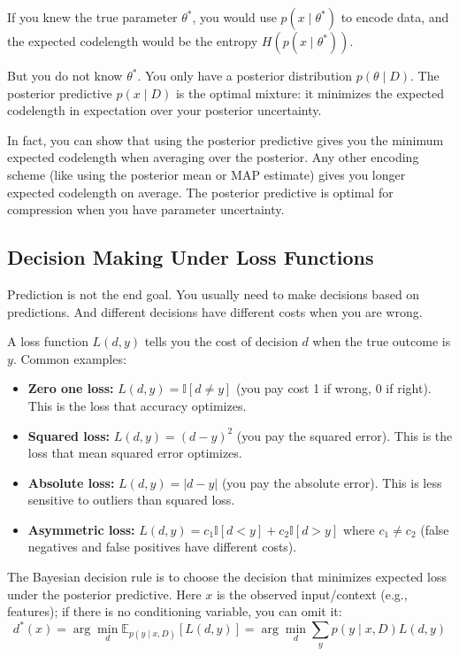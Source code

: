If you knew the true parameter $\theta^*$, you would use $p(x \mid \theta^*)$ to encode data, and the expected codelength would be the entropy $H(p(x \mid \theta^*))$.

But you do not know $\theta^*$. You only have a posterior distribution $p(\theta \mid D)$. The posterior predictive $p(x \mid D)$ is the optimal mixture: it minimizes the expected codelength in expectation over your posterior uncertainty.

In fact, you can show that using the posterior predictive gives you the minimum expected codelength when averaging over the posterior. Any other encoding scheme (like using the posterior mean or MAP estimate) gives you longer expected codelength on average. The posterior predictive is optimal for compression when you have parameter uncertainty.

\subsection{Decision Making Under Loss Functions}

Prediction is not the end goal. You usually need to make decisions based on predictions. And different decisions have different costs when you are wrong.

A loss function $L(d, y)$ tells you the cost of decision $d$ when the true outcome is $y$. Common examples:

\begin{itemize}
\item \textbf{Zero one loss:} $L(d, y) = \mathbb{I}[d \neq y]$ (you pay cost 1 if wrong, 0 if right). This is the loss that accuracy optimizes.

\item \textbf{Squared loss:} $L(d, y) = (d - y)^2$ (you pay the squared error). This is the loss that mean squared error optimizes.

\item \textbf{Absolute loss:} $L(d, y) = |d - y|$ (you pay the absolute error). This is less sensitive to outliers than squared loss.

\item \textbf{Asymmetric loss:} $L(d, y) = c_1 \mathbb{I}[d < y] + c_2 \mathbb{I}[d > y]$ where $c_1 \neq c_2$ (false negatives and false positives have different costs).
\end{itemize}

The Bayesian decision rule is to choose the decision that minimizes expected loss under the posterior predictive. Here $x$ is the observed input/context (e.g., features); if there is no conditioning variable, you can omit it:
\begin{equation}
d^*(x) = \arg\min_{d} \mathbb{E}_{p(y \mid x, D)}[L(d, y)] = \arg\min_{d} \sum_{y} p(y \mid x, D) L(d, y)
\end{equation}

